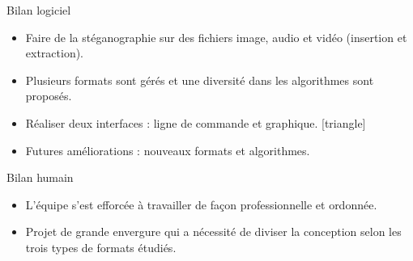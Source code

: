 \documentclass{beamer}
\begin{document}
  \begin{frame}
  
	\begin{block}{Bilan logiciel}
	\begin{itemize}
	[circle]
	\item Faire de la stéganographie sur des fichiers image, audio et vidéo
	(insertion et extraction). \checkmark
	\item Plusieurs formats sont gérés et une diversité dans les algorithmes 
	sont proposés. \checkmark
	\item Réaliser deux interfaces : ligne de commande et graphique. \checkmark
{}[triangle]
	\item Futures améliorations : nouveaux formats et algorithmes. 

\end{itemize}
	
	\end{block}
	
	\begin{block}{Bilan humain}
	\begin{itemize}
	[circle]
	\item L'équipe s'est efforcée à travailler de façon professionnelle et ordonnée.
	\item Projet de grande envergure qui a nécessité de diviser la conception 
	selon les trois types de formats étudiés.  
	\end{itemize}
	\end{block}

	\end{frame}
  
  
\end{document}
